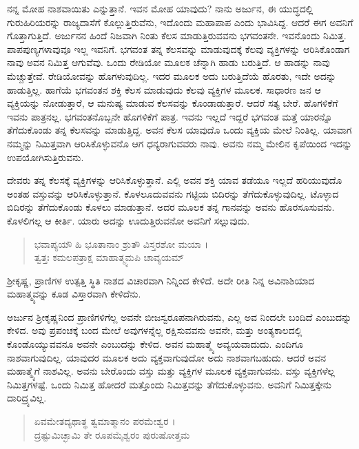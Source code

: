 ನನ್ನ ಮೋಹ ನಾಶವಾಯಿತು ಎನ್ನುತ್ತಾನೆ. ಇವನ ಮೋಹ ಯಾವುದು? ನಾನು ಅರ್ಜುನ, ಈ ಯುದ್ಧದಲ್ಲಿ ಗುರುಹಿರಿಯರನ್ನು ರಾಜ್ಯದಾಸೆಗೆ ಕೊಲ್ಲುತ್ತಿರುವೆನು, ಇದೊಂದು ಮಹಾಪಾಪ ಎಂದು ಭಾವಿಸಿದ್ದ. ಆದರೆ ಈಗ ಅವನಿಗೆ ಗೊತ್ತಾಗುತ್ತಿದೆ. ಅರ್ಜುನನ ಹಿಂದೆ ನಿಜವಾಗಿ ನಿಂತು ಕೆಲಸ ಮಾಡುತ್ತಿರುವವನು ಭಗವಂತನೇ. ಇವನೊಂದು ನಿಮಿತ್ತ. ಪಾಪಪುಣ್ಯಗಳಾವುವೂ ಇಲ್ಲ ಇವನಿಗೆ. ಭಗವಂತ ತನ್ನ ಕೆಲಸವನ್ನು ಮಾಡುವುದಕ್ಕೆ ಕೆಲವು ವ್ಯಕ್ತಿಗಳನ್ನು ಆರಿಸಿಕೊಂಡಾಗ ನಾವು ಅವನ ನಿಮಿತ್ತ ಆಗುವೆವು. ಒಂದು ರೇಡಿಯೋ ಮೂಲಕ ಚೆನ್ನಾಗಿ ಹಾಡು ಬರುತ್ತಿದೆ. ಆ ಹಾಡನ್ನು ನಾವು ಮೆಚ್ಚುತ್ತೇವೆ. ರೇಡಿಯೋವನ್ನು ಹೊಗಳುವುದಿಲ್ಲ. ಇದರ ಮೂಲಕ ಅದು ಬರುತ್ತಿದೆಯೆ ಹೊರತು, ಇದೇ ಅದನ್ನು ಹಾಡುತ್ತಿಲ್ಲ. ಹಾಗೆಯೆ ಭಗವಂತನ ಶಕ್ತಿ ಕೆಲಸ ಮಾಡುವುದು ಕೆಲವು ವ್ಯಕ್ತಿಗಳ ಮೂಲಕ. ಸಾಧಾರಣ ಜನ ಆ ವ್ಯಕ್ತಿಯನ್ನು ನೋಡುತ್ತಾರೆ, ಆ ಮನುಷ್ಯ ಮಾಡುವ ಕೆಲಸವನ್ನು ಕೊಂಡಾಡುತ್ತಾರೆ. ಆದರೆ ಸತ್ಯ ಬೇರೆ. ಹೊಗಳಿಕೆಗೆ ಇವನು ಪಾತ್ರನಲ್ಲ. ಭಗವಂತನೊಬ್ಬನೇ ಹೊಗಳಿಕೆಗೆ ಪಾತ್ರ. ಇವನು ಇಲ್ಲದೆ ಇದ್ದರೆ ಭಗವಂತ ಮತ್ತೆ ಯಾರನ್ನೊ ತೆಗೆದುಕೊಂಡು ತನ್ನ ಕೆಲಸವನ್ನು ಮಾಡುತ್ತಿದ್ದ. ಅವನ ಕೆಲಸ ಯಾವುದೊ ಒಂದು ವ್ಯಕ್ತಿಯ ಮೇಲೆ ನಿಂತಿಲ್ಲ. ಯಾವಾಗ ನಮ್ಮನ್ನು ನಿಮಿತ್ತವಾಗಿ ಆರಿಸಿಕೊಳ್ಳುವನೊ ಆಗ ಧನ್ಯರಾಗುವವರು ನಾವು. ಅವನು ನಮ್ಮ ಮೇಲಿನ ಕೃಪೆಯಿಂದ ಇದನ್ನು ಉಪಯೋಗಿಸುತ್ತಿರುವನು.

ದೇವರು ತನ್ನ ಕೆಲಸಕ್ಕೆ ವ್ಯಕ್ತಿಗಳನ್ನು ಆರಿಸಿಕೊಳ್ಳುತ್ತಾನೆ. ಎಲ್ಲಿ ಅವನ ಶಕ್ತಿ ಯಾವ ತಡೆಯೂ ಇಲ್ಲದೆ ಹರಿಯುವುದೊ ಅಂತಹ ವಸ್ತುವನ್ನು ಆರಿಸಿಕೊಳ್ಳುತ್ತಾನೆ. ಕೊಳಲೂದುವವನು ಗಟ್ಟಿಯ ಬಿದಿರನ್ನು ತೆಗೆದುಕೊಳ್ಳುವುದಿಲ್ಲ. ಟೊಳ್ಳಾದ ಬಿದಿರನ್ನು ತೆಗೆದುಕೊಂಡು ಕೊಳಲು ಮಾಡುತ್ತಾನೆ. ಅದರ ಮೂಲಕ ತನ್ನ ಗಾನವನ್ನು ಅವನು ಹೊರಸೂಸುವನು. ಕೊಳಲಿಗಲ್ಲ ಆ ಕೀರ್ತಿ. ಯಾರು ಅದನ್ನು ಊದುತ್ತಿರುವನೋ ಅವನಿಗೆ ಸಲ್ಲುವುದು.

\begin{verse}
ಭವಾಪ್ಯಯೌ ಹಿ ಭೂತಾನಾಂ ಶ್ರುತೌ ವಿಸ್ತರಶೋ ಮಯಾ ।\\ತ್ವತ್ತಃ ಕಮಲಪತ್ರಾಕ್ಷ ಮಾಹಾತ್ಮ್ಯಮಪಿ ಚಾವ್ಯಯಮ್ 
\end{verse}

{\small ಶ್ರೀಕೃಷ್ಣ, ಪ್ರಾಣಿಗಳ ಉತ್ಪತ್ತಿ ಸ್ಥಿತಿ ನಾಶದ ವಿಚಾರವಾಗಿ ನಿನ್ನಿಂದ ಕೇಳಿದೆ. ಅದೇ ರೀತಿ ನಿನ್ನ ಅವಿನಾಶಿಯಾದ ಮಹಾತ್ಮ್ಯವನ್ನು ಕೂಡ ವಿಸ್ತಾರವಾಗಿ ಕೇಳಿದೆನು.}

ಅರ್ಜುನ ಶ್ರೀಕೃಷ್ಣನಿಂದ ಪ್ರಾಣಿಗಳಿಗೆಲ್ಲ ಅವನೇ ಬೀಜಸ್ವರೂಪನಾಗಿರುವನು, ಎಲ್ಲ ಅವ ನಿಂದಲೇ ಬಂದಿದೆ ಎಂಬುದನ್ನು ಕೇಳಿದ. ಅವು ಪ್ರಪಂಚಕ್ಕೆ ಬಂದ ಮೇಲೆ ಅವುಗಳನ್ನೆಲ್ಲ ರಕ್ಷಿಸುವವನು ಅವನೇ, ಮತ್ತು ಅಂತ್ಯಕಾಲದಲ್ಲಿ ಕೊಂಡೊಯ್ಯುವವನೂ ಅವನೇ ಎಂಬುದನ್ನು ಕೇಳಿದ. ಅವನ ಮಹಾತ್ಮ್ಯೆ ಅವ್ಯಯವಾದುದು. ಎಂದಿಗೂ ನಾಶವಾಗುವುದಿಲ್ಲ. ಯಾವುದರ ಮೂಲಕ ಅದು ವ್ಯಕ್ತವಾಗುವುದೋ ಅದು ನಾಶವಾಗಬಹುದು. ಆದರೆ ಅವನ ಮಹಾತ್ಮ್ಯೆಗೆ ನಾಶವಿಲ್ಲ. ಅವನು ಬೇರೊಂದು ವಸ್ತು ಮತ್ತು ವ್ಯಕ್ತಿಗಳ ಮೂಲಕ ವ್ಯಕ್ತವಾಗುವನು. ವಸ್ತು ವ್ಯಕ್ತಿಗಳೆಲ್ಲ ನಿಮಿತ್ತಗಳಷ್ಟೆ. ಒಂದು ನಿಮಿತ್ತ ಹೋದರೆ ಮತ್ತೊಂದು ನಿಮಿತ್ತವನ್ನು ತೆಗೆದುಕೊಳ್ಳುವನು. ಅವನಿಗೆ ನಿಮಿತ್ತಕ್ಕೇನು ದಾರಿದ್ರ್ಯವಿಲ್ಲ.

\begin{verse}
ಏವಮೇತದ್ಯಥಾತ್ಥ ತ್ವಮಾತ್ಮಾನಂ ಪರಮೇಶ್ವರ ।\\ದ್ರಷ್ಟುಮಿಚ್ಛಾಮಿ ತೇ ರೂಪಮೈಶ್ವರಂ ಪುರುಷೋತ್ತಮ 
\end{verse}

